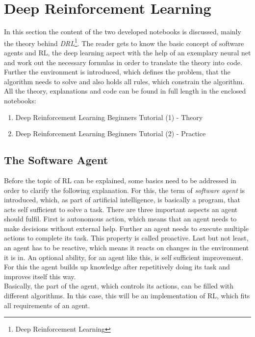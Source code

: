\section{Deep Reinforcement Learning}
	In this section the content of the two developed notebooks is discussed, mainly the theory behind \textit{DRL}\footnote{Deep Reinforcement Learning}. The reader gets to know the basic concept of software agents and RL, the deep learning aspect with the help of an exemplary neural net and work out the necessary formulas in order to translate the theory into code. Further the environment is introduced, which defines the problem, that the algorithm needs to solve and also holds all rules, which constrain the algorithm.  All the theory, explanations and code can be found in full length in the enclosed notebooks:
	\begin{enumerate}
		\item Deep Reinforcement Learning Beginners Tutorial (1) - Theory 
		\item Deep Reinforcement Learning Beginners Tutorial (2) - Practice
	\end{enumerate}

\subsection{The Software Agent}
	Before the topic of RL can be explained, some basics need to be addressed in order to clarify the following explanation.
	For this, the term of \textit{software agent} is introduced, which, as part of artificial intelligence, is basically a program, that acts self sufficient to solve a task.
	There are three important aspects an agent should fulfil. 
	First is autonomous action, which means that an agent needs to make decisions without external help.
	Further an agent needs to execute multiple actions to complete its task. 
	This property is called proactive.
	Last but not least, an agent has to be reactive, which means it reacts on changes in the environment it is in.
	An optional ability, for an agent like this, is self sufficient improvement. For this the agent builds up knowledge after repetitively doing its task and improves itself this way.\\
	Basically, the part of the agent, which controls its actions, can be filled with different algorithms. In this case, this will be an implementation of RL, which fits all requirements of an agent.

